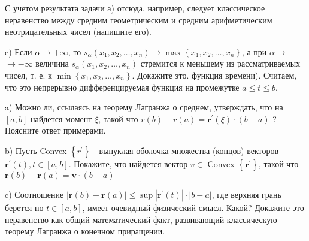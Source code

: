 \documentclass{article}
\begin{document}
С учетом результата задачи а) отсюда, например, следует классическое неравенство между средним геометрическим и средним арифметическим неотрицательных чисел (напишите его).

c) Если $\alpha \rightarrow+\infty$, то $s_\alpha\left(x_1, x_2, \ldots, x_n\right) \rightarrow \max \left\{x_1, x_2, \ldots, x_n\right\}$, а при $\alpha \rightarrow$ $\rightarrow-\infty$ величина $s_\alpha\left(x_1, x_2, \ldots, x_n\right)$ стремится к меньшему из рассматриваемых чисел, т. е. к $\min \left\{x_1, x_2, \ldots, x_n\right\}$. Докажите это. функция времени). Считаем, что это непрерывно дифференцируемая функция на промежутке $a \leqslant t \leqslant b$.

a) Можно ли, ссылаясь на теорему Лагранжа о среднем, утверждать, что на $[a, b]$ найдется момент $\xi$, такой что $r(b)-r(a)=\boldsymbol{r}^{\prime}(\xi) \cdot(b-a)$ ? Поясните ответ примерами.

b) Пусть Convex $\left\{r^{\prime}\right\}$ - выпуклая оболочка множества (концов) векторов $\boldsymbol{r}^{\prime}(t), t \in[a, b]$. Покажите, что найдется вектор $v \in$ Convex $\left\{\boldsymbol{r}^{\prime}\right\}$, такой что $\boldsymbol{r}(b)-\boldsymbol{r}(a)=\boldsymbol{v} \cdot(b-a)$

c) Соотношение $|\boldsymbol{r}(b)-\boldsymbol{r}(a)| \leqslant \sup \left|\boldsymbol{r}^{\prime}(t)\right| \cdot|b-a|$, где верхняя грань берется по $t \in[a, b]$, имеет очевидный физический смысл. Какой? Докажите это неравенство как общий математический факт, развивающий классическую теорему Лагранжа о конечном приращении.
\end{document}
